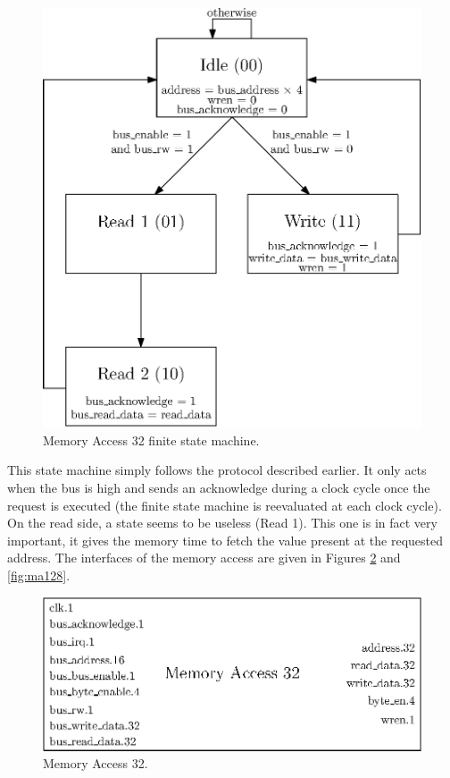 \begin{figure}[ht!]
    \center
    \includegraphics[scale=0.8]{"Chapter5-MAU_CTRLU/res/mau_fsm"}
    \caption{Memory Access 32 finite state machine.}
    \label{fig:ma_fsm}
\end{figure}

This state machine simply follows the protocol described earlier. It only acts when the bus is high 
and sends an acknowledge during a clock cycle once the request is executed (the finite state machine 
is reevaluated at each clock cycle). On the read side, a state seems to be useless (Read 1). This 
one is in fact very important, it gives the memory time to fetch the value present at the requested 
address. The interfaces of the memory access are given in Figures \ref{fig:ma32} and \ref{fig:ma128}.

\begin{figure}[ht!]
    \center
    \includegraphics[scale=0.8]{"Chapter5-MAU_CTRLU/res/memory_access_32"}
    \caption{Memory Access 32.}
    \label{fig:ma32}
\end{figure}


